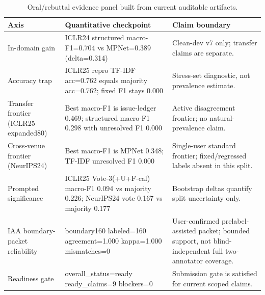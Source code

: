 \begin{table}[t]
\centering
\scriptsize
\setlength{\tabcolsep}{3pt}
\begin{tabular}{p{}p{}p{}}
\toprule
Axis & Quantitative checkpoint & Claim boundary \\
\midrule
In-domain gain & ICLR24 structured macro-F1=0.704 vs MPNet=0.389 (delta=0.314) & Clean-dev v7 only; transfer claims are separate. \\
Accuracy trap & ICLR25 repro TF-IDF acc=0.762 equals majority acc=0.762; fixed F1 stays 0.000 & Stress-set diagnostic, not prevalence estimate. \\
Transfer frontier (ICLR25 expanded80) & Best macro-F1 is issue-ledger 0.469; structured macro-F1 0.298 with unresolved F1 0.000 & Active disagreement frontier; no natural-prevalence claim. \\
Cross-venue frontier (NeurIPS24) & Best macro-F1 is MPNet 0.348; TF-IDF unresolved F1 0.000 & Single-user standard frontier; fixed/regressed labels absent in this split. \\
Prompted significance & ICLR25 Vote-3(+U+F-cal) macro-F1 0.094 vs majority 0.226; NeurIPS24 vote 0.167 vs majority 0.177 & Bootstrap deltas quantify split uncertainty only. \\
IAA boundary-packet reliability & boundary160 labeled=160 agreement=1.000 kappa=1.000 mismatches=0 & User-confirmed prelabel-assisted packet; bounded support, not blind-independent full two-annotator coverage. \\
Readiness gate & overall\_status=ready ready\_claims=9 blockers=0 & Submission gate is satisfied for current scoped claims. \\
\bottomrule
\end{tabular}
\caption{Oral/rebuttal evidence panel built from current auditable artifacts.}
\label{tab:oral-evidence-panel}
\end{table}
